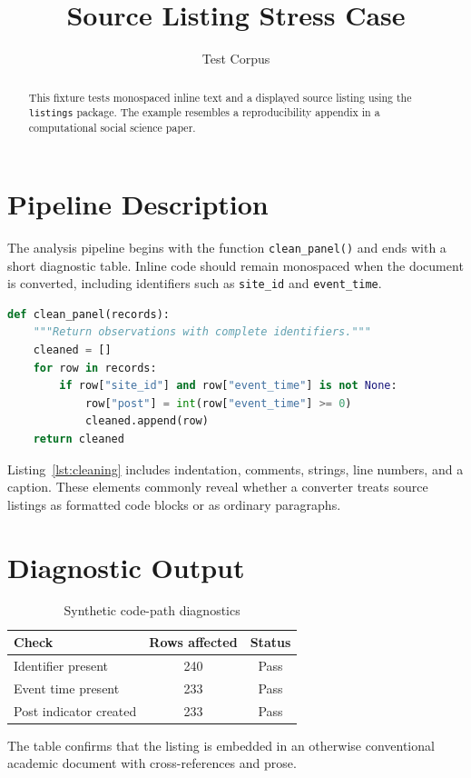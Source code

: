 \documentclass[11pt]{article}
\title{Source Listing Stress Case}
\author{Test Corpus}
\date{}
\begin{document}
\maketitle

\begin{abstract}
This fixture tests monospaced inline text and a displayed source listing using
the \texttt{listings} package. The example resembles a reproducibility appendix
in a computational social science paper.
\end{abstract}

\section{Pipeline Description}
\label{sec:pipeline}

The analysis pipeline begins with the function \texttt{clean\_panel()} and ends
with a short diagnostic table. Inline code should remain monospaced when the
document is converted, including identifiers such as \texttt{site\_id} and
\texttt{event\_time}.

\begin{lstlisting}[language=Python,caption={Minimal synthetic cleaning step},label={lst:cleaning}]
def clean_panel(records):
    """Return observations with complete identifiers."""
    cleaned = []
    for row in records:
        if row["site_id"] and row["event_time"] is not None:
            row["post"] = int(row["event_time"] >= 0)
            cleaned.append(row)
    return cleaned
\end{lstlisting}

Listing~\ref{lst:cleaning} includes indentation, comments, strings, line
numbers, and a caption. These elements commonly reveal whether a converter treats
source listings as formatted code blocks or as ordinary paragraphs.

\section{Diagnostic Output}
\label{sec:diagnostic}

\begin{table}[htbp]
\centering
\caption{Synthetic code-path diagnostics}
\label{tab:diagnostics}
\begin{tabular}{lcc}
\toprule
Check & Rows affected & Status \\
\midrule
Identifier present & 240 & Pass \\
Event time present & 233 & Pass \\
Post indicator created & 233 & Pass \\
\bottomrule
\end{tabular}
\end{table}

The table confirms that the listing is embedded in an otherwise conventional
academic document with cross-references and prose.
\end{document}
